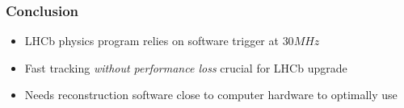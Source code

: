 \documentclass[table,xcolor=dvipsnames,professionalfonts]{beamer}
\begin{document}
\begin{frame}
  \frametitle{Conclusion}
  \begin{itemize}
    \item LHCb physics program relies on software trigger at $\unit{30}{MHz}$
    \item Fast tracking \emph{without performance loss} crucial for LHCb upgrade
      \item Needs reconstruction software close to computer hardware to optimally use 
  \end{itemize}

\end{frame}
\end{document}
